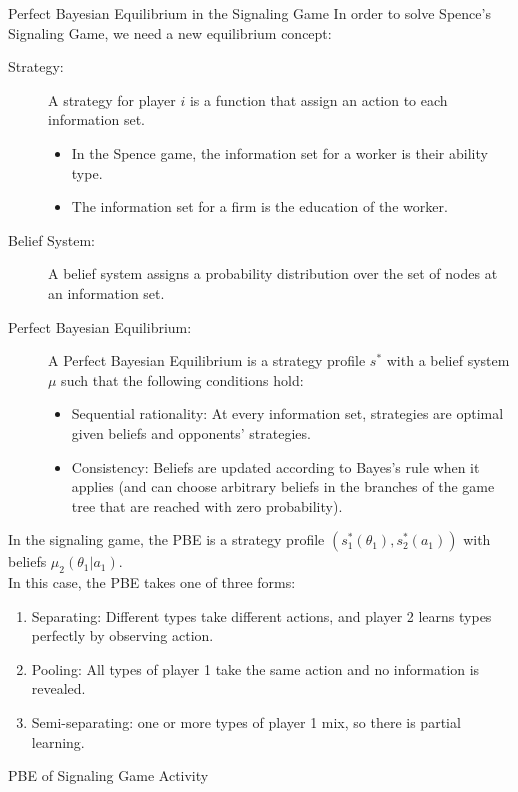\documentclass[10pt]{extarticle}
\begin{document}
  \begin{problem}{Perfect Bayesian Equilibrium in the Signaling Game}
    In order to solve Spence's Signaling Game, we need a new equilibrium concept:
    \begin{description}
      \item[Strategy:] A strategy for player $i$ is a function that assign an action to each information set.
        \begin{itemize}
          \item In the Spence game, the information set for a worker is their ability type.
          \item The information set for a firm is the education of the worker.
        \end{itemize}
      \item[Belief System:] A belief system assigns a probability distribution over the set of nodes at an information set.
      \item[Perfect Bayesian Equilibrium:] A Perfect Bayesian Equilibrium is a strategy profile $s^{\ast}$ with a belief system $\mu$ such that the following conditions hold:
        \begin{itemize}
          \item Sequential rationality: At every information set, strategies are optimal given beliefs and opponents' strategies.
          \item Consistency: Beliefs are updated according to Bayes's rule when it applies (and can choose arbitrary beliefs in the branches of the game tree that are reached with zero probability).
        \end{itemize}
    \end{description}
    In the signaling game, the PBE is a strategy profile $(s_1^{\ast}(\theta_1),s_2^{\ast}(a_1))$ with beliefs $\mu_2(\theta_1|a_1)$.\\

    In this case, the PBE takes one of three forms:
    \begin{enumerate}[(1)]
      \item Separating: Different types take different actions, and player 2 learns types perfectly by observing action.
      \item Pooling: All types of player 1 take the same action and no information is revealed.
      \item Semi-separating: one or more types of player 1 mix, so there is partial learning.
    \end{enumerate}
  \end{problem}
  \begin{problem}{PBE of Signaling Game Activity}
    \begin{tcbraster}[raster columns = 2, sharp corners, colframe = black!75!white,colback=white]
    \end{tcbraster}
  \end{problem}
\end{document}
